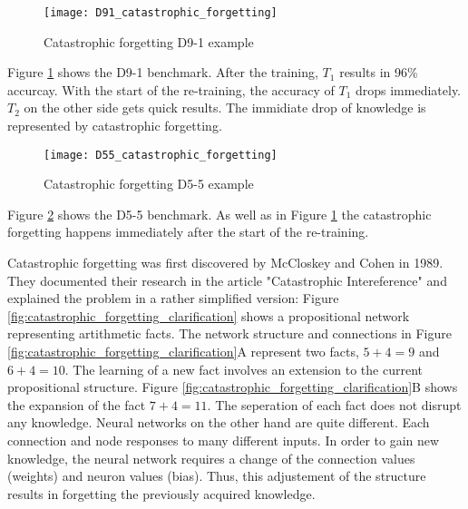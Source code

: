 \begin{figure}[H]
    \centering
    \texttt{[image: D91\_catastrophic\_forgetting]}
    \caption{Catastrophic forgetting D9-1 example}
    \label{fig:catastrophic_forgetting_d91_example}
\end{figure}

Figure \ref{fig:catastrophic_forgetting_d91_example} shows the D9-1 benchmark.
After the training, $T_1$ results in 96\% accurcay.
With the start of the re-training, the accuracy of $T_1$ drops immediately.
$T_2$ on the other side gets quick results.
\newline
The immidiate drop of knowledge is represented by catastrophic forgetting.

\begin{figure}[H]
    \centering
    \texttt{[image: D55\_catastrophic\_forgetting]}
    \caption{Catastrophic forgetting D5-5 example}
    \label{fig:catastrophic_forgetting_d55_example}
\end{figure}

Figure \ref{fig:catastrophic_forgetting_d55_example} shows the D5-5 benchmark.
As well as in Figure \ref{fig:catastrophic_forgetting_d91_example} the catastrophic forgetting happens immediately after the start of the re-training.

Catastrophic forgetting was first discovered by McCloskey and Cohen in 1989.
They documented their research in the article "Catastrophic Intereference" \cite{psychology_learning_mccloskey_cohen} and explained the problem in a rather simplified version:
\cite{psychology_learning_mccloskey_cohen}
\newline
Figure \ref{fig:catastrophic_forgetting_clarification} shows a propositional network representing artithmetic facts.
The network structure and connections in Figure \ref{fig:catastrophic_forgetting_clarification}A represent two facts, $5 + 4 = 9$ and $6 + 4 = 10$.
The learning of a new fact involves an extension to the current propositional structure.
Figure \ref{fig:catastrophic_forgetting_clarification}B shows the expansion of the fact $7 + 4 = 11$.
The seperation of each fact does not disrupt any knowledge.
\cite{psychology_learning_mccloskey_cohen}
\newline
Neural networks on the other hand are quite different.
Each connection and node responses to many different inputs.
In order to gain new knowledge, the neural network requires a change of the connection values (weights) and neuron values (bias).
Thus, this adjustement of the structure results in forgetting the previously acquired knowledge.
\cite{psychology_learning_mccloskey_cohen}


